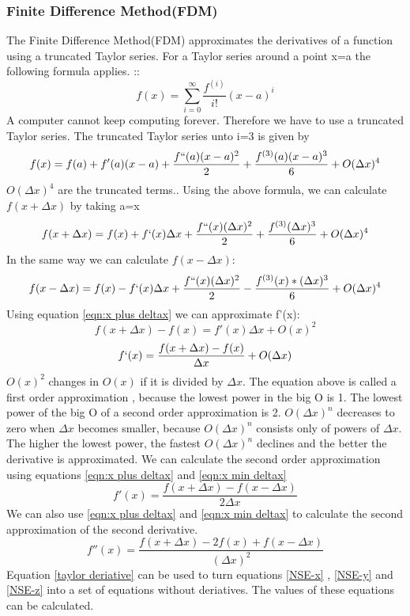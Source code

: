 \documentclass{article}
\begin{document}
\subsubsection{Finite Difference Method(FDM)}
The Finite Difference Method(FDM) approximates the derivatives of a function using a truncated Taylor series. For a Taylor series around a point x=a the following formula applies. :\cite{Taylor series}:
\[f(x)=\sum_{i=0}^{\infty}\frac{f^{(i)}}{i!}(x-a)^{i}\]
A computer cannot keep computing forever. Therefore we have to use a truncated Taylor series. The truncated Taylor series unto i=3 is given by \cite{Taylor series approximation}
\[f(x)=f(a)+f'(a)(x-a)+\frac{f``(a)(x-a)^{2}}{2} + \frac{f^{(3)}(a)(x-a)^{3}}{6}+O(\Delta x)^{4}\]
$O(\Delta x) ^{4}$ are the truncated terms.\cite{Big O}. Using the above formula, we can calculate $f(x+\Delta x)$ by taking a=x\cite{quantstart FDM}
\begin{equation}f(x+\Delta x)=f(x)+f`(x)\Delta x + \frac{f``(x) (\Delta x)^{2}}{2}+ \frac{f^{(3)} (\Delta x)^{3}}{6} + O(\Delta x)^{4}\label{eqn:x plus deltax}\end{equation}
In the same way we can calculate $f(x-\Delta x)$:
\begin{equation}f(x- \Delta x)=f(x)-f`(x)\Delta x + \frac{f``(x)(\Delta x)^{2}}{2}-\frac{f^{(3)}(x)*(\Delta x)^{3}}{6} + O(\Delta x) ^{4} \label{eqn:x min deltax}\end{equation}
Using equation \ref{eqn:x plus deltax} we can approximate f'(x):
\[f(x+\Delta x) -f(x) = f'(x)\Delta x + O(x)^{2}\]
\[f`(x)=\frac{f(x+\Delta x) - f(x)}{\Delta x} + O(\Delta x)\]
$O(x)^{2}$ changes in $O(x)$ if it is divided by $\Delta x $. The equation above is called a first order approximation , because the lowest power in the big O is 1. The lowest power of the big O of a second order approximation is 2. $O(\Delta x)^{n}$ decreases to zero when $\Delta x$ becomes smaller, because $O(\Delta x)^{n}$ consists only of powers of $\Delta x$. The higher the lowest power, the fastest $O(\Delta x)^{n}$ declines and the better the derivative is approximated. We can calculate the second order approximation using equations \ref{eqn:x plus deltax} and \ref{eqn:x min deltax}
\begin{equation}f'(x)=\frac{f(x+\Delta x)-f(x-\Delta x)}{2\Delta x}\label{taylor deriative}\end{equation}
We can also use \ref{eqn:x plus deltax} and \ref{eqn:x min deltax} to calculate the second approximation of the second derivative.
\[f''(x)=\frac{f(x+\Delta x)-2f(x)+f(x-\Delta x)}{(\Delta x)^{2}}\]
Equation \ref{taylor deriative} can be used to turn equations \ref{NSE-x} , \ref{NSE-y} and \ref{NSE-z} into a set of equations without deriatives. The values of these equations can be calculated. 
\end{document}
